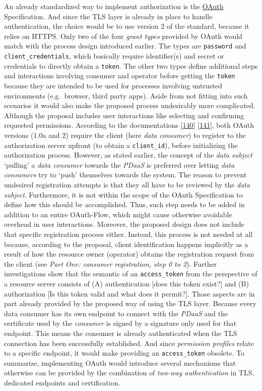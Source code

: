 \documentclass[12pt,english,a4paper,titlepage,cleardoublepage=empty,dottedtoc]{report}
\begin{document}
An already standardized way to implement authorization is the
\protect\hyperlink{def--oauth}{OAuth} Specification. And since the TLS
layer is already in place to handle authentication, the choice would be
to use version 2 of the standard, because it relies on HTTPS. Only two
of the four \emph{grant types} provided by OAuth would match with the
process design introduced earlier. The types are \texttt{password} and
\texttt{client\_credentials}, which basically require identifier(s) and
secret or credentials to directly obtain a \texttt{token}. The other two
types define additional steps and interactions involving consumer and
operator before getting the \texttt{token} because they are intended to
be used for processes involving untrusted environments (e.g.~browser,
third party apps). Aside from not fitting into such scenarios it would
also make the proposed process undesirably more complicated. Although
the proposal includes user interactions like selecting and confirming
requested permissions. According to the documentations
{[}\protect\hyperlink{ref-web_spec_oauth-1a_client-reg}{140}{]}
{[}\protect\hyperlink{ref-web_spec_oauth-2_client-reg}{141}{]}, both
OAuth versions (1.0a and 2) require the client (here \emph{data
consumer}) to register to the authorization server upfront (to obtain a
\texttt{client\_id}), before initializing the authorization process.
However, as stated earlier, the concept of the \emph{data subject}
`pulling' a \emph{data consumer} towards the \emph{PDaaS} is preferred
over letting \emph{data consumers} try to `push' themselves towards the
system. The reason to prevent undesired registration attempts is that
they all have to be reviewed by the \emph{data subject}. Furthermore, it
is not within the scope of the OAuth Specification to define how this
should be accomplished. Thus, such step needs to be added in addition to
an entire OAuth-Flow, which might cause otherwise avoidable overhead in
user interactions. Moreover, the proposed design does not include that
specific registration process either. Instead, this process is not
needed at all because, according to the proposal, client identification
happens implicitly as a result of how the resource owner (operator)
obtains the registration request from the client (see \emph{Part One:
consumer registration, step 0 to 2}). Further investigations show that
the semantic of an \texttt{access\_token} from the perspective of a
resource server consists of (A) authentication {[}does this token
exist?{]} and (B) authorization {[}Is this token valid and what does it
permit?{]}. Those aspects are in part already provided by the proposed
way of using the TLS layer. Because every data consumer has its own
endpoint to connect with the \emph{PDaaS} and the certificate used by
the \emph{consumer} is signed by a signature only used for that
endpoint. This means the consumer is already authenticated when the TLS
connection has been successfully established. And since \emph{permission
profiles} relate to a specific endpoint, it would make providing an
\texttt{access\_token} obsolete. To summarize, implementing OAuth would
introduce several mechanisms that otherwise can be provided by the
combination of \emph{two-way authentication} in TLS, dedicated endpoints
and certification.
\end{document}
